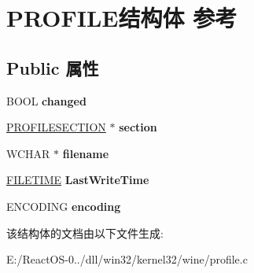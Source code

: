 \hypertarget{struct_p_r_o_f_i_l_e}{}\section{P\+R\+O\+F\+I\+L\+E结构体 参考}
\label{struct_p_r_o_f_i_l_e}
\subsection*{Public 属性}
\begin{DoxyCompactItemize}
\item 
\mbox{\label{struct_p_r_o_f_i_l_e_aaedb2e541395ee74bbef066519383d3c}} 
B\+O\+OL {\bfseries changed}
\item 
\mbox{\label{struct_p_r_o_f_i_l_e_ad2796e319c69e00b320755c2fde19694}} 
\hyperlink{structtag_p_r_o_f_i_l_e_s_e_c_t_i_o_n}{P\+R\+O\+F\+I\+L\+E\+S\+E\+C\+T\+I\+ON} $\ast$ {\bfseries section}
\item 
\mbox{\label{struct_p_r_o_f_i_l_e_a7d3950a8ea597520331f4e4da7c1ec6f}} 
W\+C\+H\+AR $\ast$ {\bfseries filename}
\item 
\mbox{\label{struct_p_r_o_f_i_l_e_a7f446ac4d5ddfa8c43a3702b440955cd}} 
\hyperlink{struct___f_i_l_e_t_i_m_e}{F\+I\+L\+E\+T\+I\+ME} {\bfseries Last\+Write\+Time}
\item 
\mbox{\label{struct_p_r_o_f_i_l_e_a2caa7b5265feb29bdbea5361bcfe4ad3}} 
E\+N\+C\+O\+D\+I\+NG {\bfseries encoding}
\end{DoxyCompactItemize}


该结构体的文档由以下文件生成\+:\begin{DoxyCompactItemize}
\item 
E\+:/\+React\+O\+S-\/0../dll/win32/kernel32/wine/profile.\+c\end{DoxyCompactItemize}
